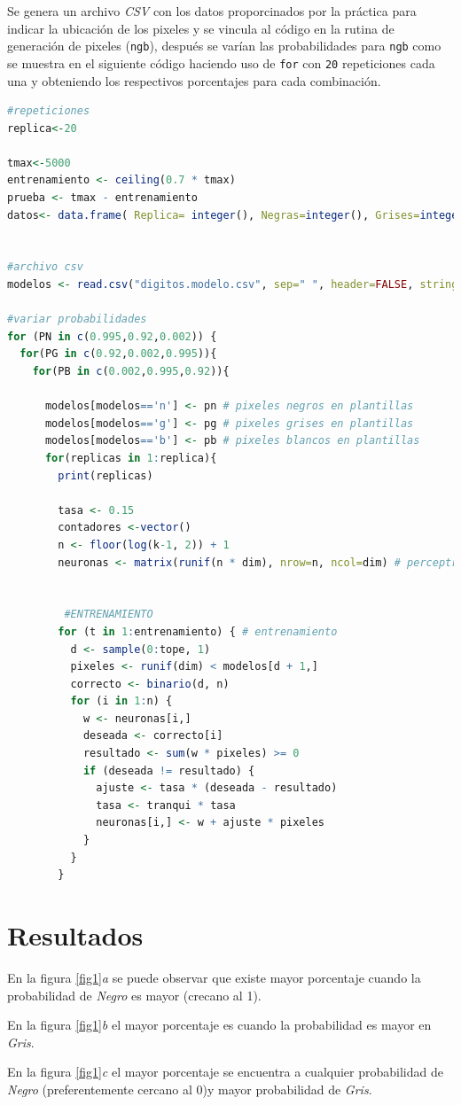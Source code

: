 \documentclass{article}
\begin{document}
Se genera un archivo \textit{CSV} con los datos proporcinados por la práctica para indicar la ubicación de los pixeles y se vincula al código en la rutina de generación de pixeles (\texttt{ngb}), después se varían las probabilidades para \texttt{ngb} como se muestra en el siguiente código haciendo uso de \texttt{for} con \texttt{20} repeticiones cada una y obteniendo los respectivos porcentajes para cada combinación.

\begin{lstlisting}[language=R]
#repeticiones
replica<-20

tmax<-5000
entrenamiento <- ceiling(0.7 * tmax)
prueba <- tmax - entrenamiento
datos<- data.frame( Replica= integer(), Negras=integer(), Grises=integer(), Blancas=integer(), Porcentaje=integer())


#archivo csv
modelos <- read.csv("digitos.modelo.csv", sep=" ", header=FALSE, stringsAsFactors=F)

#variar probabilidades 
for (PN in c(0.995,0.92,0.002)) {
  for(PG in c(0.92,0.002,0.995)){
    for(PB in c(0.002,0.995,0.92)){
     
      modelos[modelos=='n'] <- pn # pixeles negros en plantillas
      modelos[modelos=='g'] <- pg # pixeles grises en plantillas
      modelos[modelos=='b'] <- pb # pixeles blancos en plantillas
      for(replicas in 1:replica){
        print(replicas)
      
        tasa <- 0.15
        contadores <-vector()
        n <- floor(log(k-1, 2)) + 1
        neuronas <- matrix(runif(n * dim), nrow=n, ncol=dim) # perceptrones
       
        
         #ENTRENAMIENTO
        for (t in 1:entrenamiento) { # entrenamiento
          d <- sample(0:tope, 1)
          pixeles <- runif(dim) < modelos[d + 1,]
          correcto <- binario(d, n)
          for (i in 1:n) {
            w <- neuronas[i,]
            deseada <- correcto[i]
            resultado <- sum(w * pixeles) >= 0
            if (deseada != resultado) {
              ajuste <- tasa * (deseada - resultado)
              tasa <- tranqui * tasa
              neuronas[i,] <- w + ajuste * pixeles
            }
          }
        }
\end{lstlisting}



\newpage


\section{Resultados}
En la figura \ref{fig1}\textit{a} se puede observar que existe mayor porcentaje cuando la probabilidad de \textit{Negro} es mayor (crecano al 1).    \par
En la figura \ref{fig1}\textit{b} el mayor porcentaje es cuando la probabilidad es mayor en \textit{Gris}. \par
En la figura \ref{fig1}\textit{c} el mayor porcentaje se encuentra a cualquier probabilidad de \textit{Negro} (preferentemente cercano al 0)y mayor probabilidad de \textit{Gris}.
 
\end{document}
